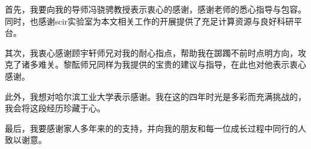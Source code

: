 \begin{acknowledgements}
首先，我要向我的导师冯骁骋教授表示衷心的感谢，感谢老师的悉心指导与包容。
同时，也感谢scir实验室为本文相关工作的开展提供了充足计算资源与良好科研平台。

其次，我衷心感谢顾宇轩师兄对我的耐心指点，帮助我在踯躅不前时点明方向，攻克了诸多难关。黎酝师兄同样为我提供的宝贵的建议与指导，在此也对他表示衷心感谢。

此外，我想对哈尔滨工业大学表示感谢。我在这的四年时光是多彩而充满挑战的，我会将这段经历珍藏于心。

最后，我要感谢家人多年来的的支持，并向我的朋友和每一位成长过程中同行的人致以谢意。

\end{acknowledgements}
